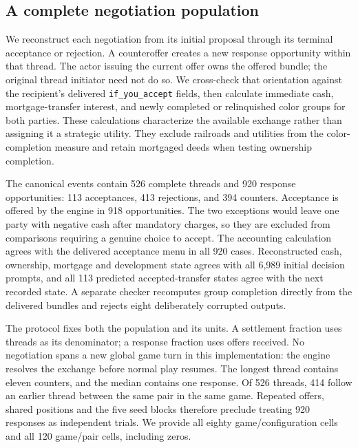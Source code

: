 
\subsection{A complete negotiation population}
\label{sec:agenda-negotiation-method}

We reconstruct each negotiation from its initial proposal through its terminal
acceptance or rejection. A counteroffer creates a new response opportunity
within that thread. The actor issuing the current offer owns the offered
bundle; the original thread initiator need not do so. We cross-check that
orientation against the recipient's delivered \texttt{if\_you\_accept} fields,
then calculate immediate cash, mortgage-transfer interest, and newly completed
or relinquished color groups for both parties. These calculations characterize
the available exchange rather than assigning it a strategic utility. They
exclude railroads and utilities from the color-completion measure and retain
mortgaged deeds when testing ownership completion.

The canonical events contain 526 complete threads and 920 response
opportunities: 113 acceptances, 413 rejections, and 394 counters. Acceptance is
offered by the engine in 918 opportunities. The two exceptions would leave one
party with negative cash after mandatory charges, so they are excluded from
comparisons requiring a genuine choice to accept. The accounting calculation
agrees with the delivered acceptance menu in all 920 cases. Reconstructed cash,
ownership, mortgage and development state agrees with all 6,989 initial decision
prompts, and all 113 predicted accepted-transfer states agree with the next
recorded state. A separate checker recomputes group completion directly from
the delivered bundles and rejects eight deliberately corrupted outputs.

The protocol fixes both the population and its units. A settlement fraction
uses threads as its denominator; a response fraction uses offers received.
No negotiation spans a new global game turn in this implementation: the engine
resolves the exchange before normal play resumes. The longest thread contains
eleven counters, and the median contains one response. Of 526 threads, 414
follow an earlier thread between the same pair in the same game. Repeated
offers, shared positions and the five seed blocks therefore preclude treating
920 responses as independent trials. We provide all eighty game/configuration
cells and all 120 game/pair cells, including zeros.

